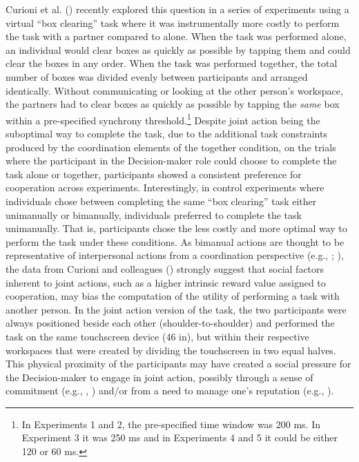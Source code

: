 \documentclass[
  man,
  floatsintext,
  longtable,
  nolmodern,
  notxfonts,
  notimes,
  colorlinks=true,linkcolor=blue,citecolor=blue,urlcolor=blue]{apa7}
\begin{document}
Curioni et al. () recently explored this
question in a series of experiments using a virtual ``box clearing''
task where it was instrumentally more costly to perform the task with a
partner compared to alone. When the task was performed alone, an
individual would clear boxes as quickly as possible by tapping them and
could clear the boxes in any order. When the task was performed
together, the total number of boxes was divided evenly between
participants and arranged identically. Without communicating or looking
at the other person's workspace, the partners had to clear boxes as
quickly as possible by tapping the \emph{same} box within a
pre-specified synchrony threshold.\footnote{In Experiments 1 and 2, the
  pre-specified time window was 200 ms. In Experiment 3 it was 250 ms
  and in Experiments 4 and 5 it could be either 120 or 60 ms.} Despite
joint action being the suboptimal way to complete the task, due to the
additional task constraints produced by the coordination elements of the
together condition, on the trials where the participant in the
Decision-maker role could choose to complete the task alone or together,
participants showed a consistent preference for cooperation across
experiments. Interestingly, in control experiments where individuals
chose between completing the same ``box clearing'' task either
unimanually or bimanually, individuals preferred to complete the task
unimanually. That is, participants chose the less costly and more
optimal way to perform the task under these conditions. As bimanual
actions are thought to be representative of interpersonal actions from a
coordination perspective (e.g., ; ),
the data from Curioni and colleagues ()
strongly suggest that social factors inherent to joint actions, such as
a higher intrinsic reward value assigned to cooperation, may bias the
computation of the utility of performing a task with another person. In
the joint action version of the task, the two participants were always
positioned beside each other (shoulder-to-shoulder) and performed the
task on the same touchscreen device (46 in), but within their respective
workspaces that were created by dividing the touchscreen in two equal
halves. This physical proximity of the participants may have created a
social pressure for the Decision-maker to engage in joint action,
possibly through a sense of commitment (e.g.,
,
) and/or from a need to manage one's
reputation (e.g., ).
\end{document}

